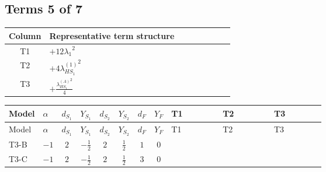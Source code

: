 \documentclass[8pt]{article}
\begin{document}
\begin{landscape}
\subsection*{Terms 5 of 7}
\begin{center}
\begin{tabular}{@{}c >{\raggedright\arraybackslash}p{0.82\linewidth}@{}}
\toprule
Column & Representative term structure \\
\midrule
T1 & \(\displaystyle +12 {\lambda_1}^2\) \\
\midrule
T2 & \(\displaystyle +4 {\lambda_{HS_1}^{(1)}}^2\) \\
\midrule
T3 & \(\displaystyle +\frac{{\lambda_{HS_1}^{(A)}}^2}{4}\) \\
\midrule
\bottomrule
\end{tabular}
\end{center}
\smallskip
\tiny
\begin{longtable}{@{}llcccccc >{\raggedright\arraybackslash}p{0.21\linewidth} >{\raggedright\arraybackslash}p{0.21\linewidth} >{\raggedright\arraybackslash}p{0.21\linewidth}@{}}
\toprule
Model & $\alpha$ & $d_{S_1}$ & $Y_{S_1}$ & $d_{S_2}$ & $Y_{S_2}$ & $d_F$ & $Y_F$ & T1 & T2 & T3 \\
\midrule
\endfirsthead
\toprule
Model & $\alpha$ & $d_{S_1}$ & $Y_{S_1}$ & $d_{S_2}$ & $Y_{S_2}$ & $d_F$ & $Y_F$ & T1 & T2 & T3 \\
\midrule
\endhead
T3-B & $-1$ & $2$ & $-\frac{1}{2}$ & $2$ & $\frac{1}{2}$ & $1$ & $0$ & \scriptsize\adjustbox{max width=\linewidth}{$\begin{gathered} +12 {\lambda_1}^2\end{gathered}$} & \scriptsize\adjustbox{max width=\linewidth}{$\begin{gathered} +4 {\lambda_{HS_1}^{(1)}}^2\end{gathered}$} & \scriptsize\adjustbox{max width=\linewidth}{$\begin{gathered} +\frac{{\lambda_{HS_1}^{(A)}}^2}{4}\end{gathered}$} \\
\midrule
T3-C & $-1$ & $2$ & $-\frac{1}{2}$ & $2$ & $\frac{1}{2}$ & $3$ & $0$ & \scriptsize\adjustbox{max width=\linewidth}{$\begin{gathered} +12 {\lambda_1}^2\end{gathered}$} & \scriptsize\adjustbox{max width=\linewidth}{$\begin{gathered} +4 {\lambda_{HS_1}^{(1)}}^2\end{gathered}$} & \scriptsize\adjustbox{max width=\linewidth}{$\begin{gathered} +\frac{{\lambda_{HS_1}^{(A)}}^2}{4}\end{gathered}$} \\

\end{longtable}
\end{landscape}
\end{document}
